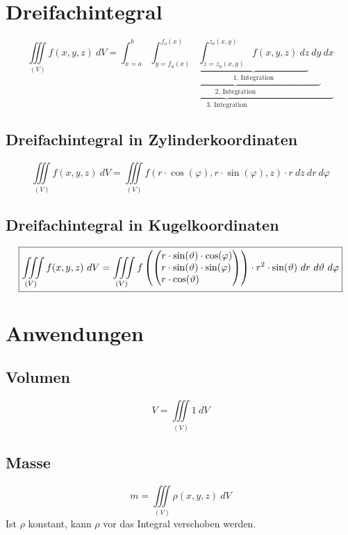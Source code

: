 \section{Dreifachintegral}
\[ \boxed{\iiint\limits_{(V)} f(x,y,z) ~ dV 
= \underbrace{\int_{x=a}^{b} 
\underbrace{\int_{y=f_u(x)}^{f_o(x)} 
\underbrace{\int_{z=z_u(x,y)}^{z_o(x,y)} f(x,y,z) ~ dz}
_{\text{1. Integration}} ~ dy}
_{\text{2. Integration}} ~ dx}
_{\text{3. Integration}}} \]

\subsection{Dreifachintegral in Zylinderkoordinaten}
\[ \boxed{\iiint\limits_{(V)} f(x,y,z) ~ dV 
= \iiint\limits_{(V)} f(r \cdot \cos(\varphi),r \cdot \sin(\varphi), z) 
\cdot r ~ dz ~ dr ~ d\varphi} \]

\subsection{Dreifachintegral in Kugelkoordinaten}
\[ \boxed{\iiint\limits_{(V)} f(x,y,z) ~ dV = \iiint\limits_{(V)} 
f\left(\left(\begin{array}{@{}l@{}}r \cdot \sin(\vartheta) \cdot \cos(\varphi) \\
r \cdot \sin(\vartheta) \cdot \sin(\varphi) \\ 
r \cdot \cos(\vartheta)\end{array}\right)\right) 
\cdot r^2 \cdot \sin(\vartheta) ~ dr ~ d\vartheta ~ d\varphi} \]

\section{Anwendungen}

\subsection{Volumen}
\[ \boxed{V = \iiint\limits_{(V)} 1 ~ dV} \]

\subsection{Masse}
\[ \boxed{m = \iiint\limits_{(V)} \rho(x,y,z) ~ dV} \]
Ist $\rho$ konstant, kann $\rho$ vor das Integral verschoben werden. 

